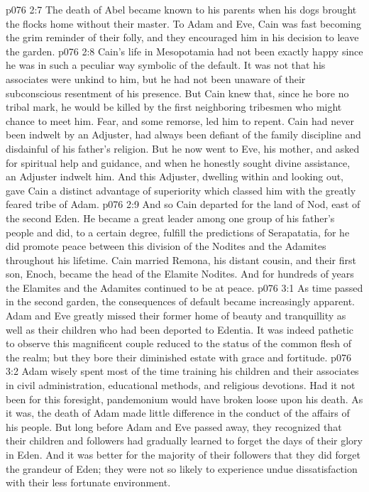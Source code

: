 \pc \vs p076 2:7 The death of Abel became known to his parents when his dogs brought the flocks home without their master. To Adam and Eve, Cain was fast becoming the grim reminder of their folly, and they encouraged him in his decision to leave the garden.
\vs p076 2:8 Cain’s life in Mesopotamia had not been exactly happy since he was in such a peculiar way symbolic of the default. It was not that his associates were unkind to him, but he had not been unaware of their subconscious resentment of his presence. But Cain knew that, since he bore no tribal mark, he would be killed by the first neighboring tribesmen who might chance to meet him. Fear, and some remorse, led him to repent. Cain had never been indwelt by an Adjuster, had always been defiant of the family discipline and disdainful of his father’s religion. But he now went to Eve, his mother, and asked for spiritual help and guidance, and when he honestly sought divine assistance, an Adjuster indwelt him. And this Adjuster, dwelling within and looking out, gave Cain a distinct advantage of superiority which classed him with the greatly feared tribe of Adam.\plusone
\vs p076 2:9 And so Cain departed for the land of Nod, east of the second Eden. He became a great leader among one group of his father’s people and did, to a certain degree, fulfill the predictions of Serapatatia, for he did promote peace between this division of the Nodites and the Adamites throughout his lifetime. Cain married Remona, his distant cousin, and their first son, Enoch, became the head of the Elamite Nodites. And for hundreds of years the Elamites and the Adamites continued to be at peace.
\vs p076 3:1 As time passed in the second garden, the consequences of default became increasingly apparent. Adam and Eve greatly missed their former home of beauty and tranquillity as well as their children who had been deported to Edentia. It was indeed pathetic to observe this magnificent couple reduced to the status of the common flesh of the realm; but they bore their diminished estate with grace and fortitude.
\vs p076 3:2 Adam wisely spent most of the time training his children and their associates in civil administration, educational methods, and religious devotions. Had it not been for this foresight, pandemonium would have broken loose upon his death. As it was, the death of Adam made little difference in the conduct of the affairs of his people. But long before Adam and Eve passed away, they recognized that their children and followers had gradually learned to forget the days of their glory in Eden. And it was better for the majority of their followers that they did forget the grandeur of Eden; they were not so likely to experience undue dissatisfaction with their less fortunate environment.
